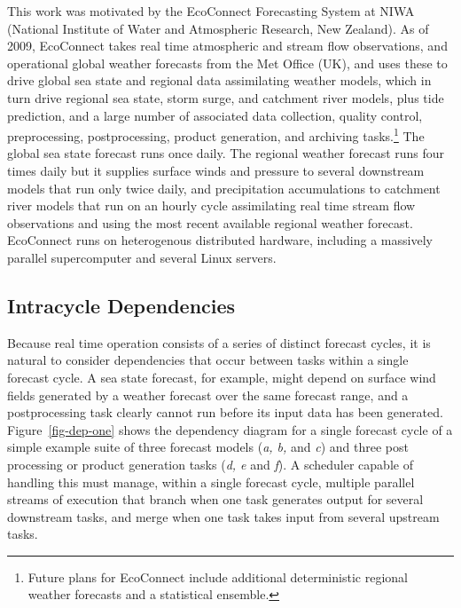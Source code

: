 \documentclass[11pt,a4paper]{article}
\begin{document}
This work was motivated by the EcoConnect Forecasting System at NIWA
(National Institute of Water and Atmospheric Research, New Zealand). As
of 2009, EcoConnect takes real time atmospheric and stream flow
observations, and operational global weather forecasts from the Met
Office (UK), and uses these to drive global sea state and regional data
assimilating weather models, which in turn drive regional sea state,
storm surge, and catchment river models, plus tide prediction, and a
large number of associated data collection, quality control,
preprocessing, postprocessing, product generation, and archiving
tasks.\footnote{Future plans for EcoConnect include additional
deterministic regional weather forecasts and a statistical ensemble.}
The global sea state forecast runs once daily.  The regional weather
forecast runs four times daily but it supplies surface winds and
pressure to several downstream models that run only twice daily, and
precipitation accumulations to catchment river models that run on an
hourly cycle assimilating real time stream flow observations and using
the most recent available regional weather forecast.  EcoConnect runs on
heterogenous distributed hardware, including a massively parallel
supercomputer and several Linux servers. 

\subsection{Intracycle Dependencies} 
\label{IntracycleDependencies}

Because real time operation consists of a series of distinct forecast
cycles, it is natural to consider dependencies that occur between tasks
within a single forecast cycle. A sea state forecast, for example, might
depend on surface wind fields generated by a weather forecast over the
same forecast range, and a postprocessing task clearly cannot run before
its input data has been generated. Figure~\ref{fig-dep-one} shows the
dependency diagram for a single forecast cycle of a simple example
suite of three forecast models ({\em a, b,} and {\em c}) and
three post processing or product generation tasks ({\em d, e} and {\em
f}).  A scheduler capable of handling this must manage, within a single
forecast cycle, multiple parallel streams of execution that branch when
one task generates output for several downstream tasks, and merge when
one task takes input from several upstream tasks. 
\end{document}
